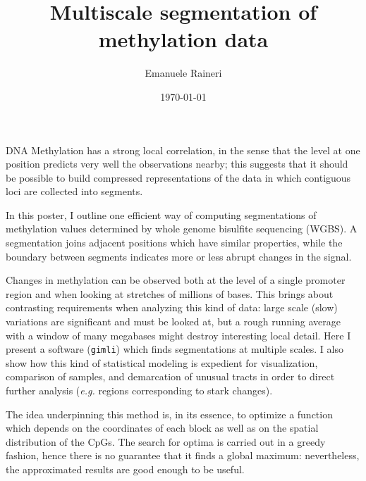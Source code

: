 \documentclass[12pt]{amsart}
\newcommand{\gimli}{\texttt{gimli}}
\newcommand{\eg}{\textit{e.g.}}
\begin{document}
\title{Multiscale segmentation of methylation data}
\author{Emanuele Raineri}
\date{\today}
\maketitle

DNA Methylation has a strong local correlation,
in the sense that the level at one position predicts 
very well the observations nearby; this suggests that it should be possible
to build compressed representations of the data in which contiguous loci 
are collected into segments.

In this poster, I outline one efficient way of computing 
segmentations of methylation values determined by 
whole genome bisulfite sequencing (WGBS).
A segmentation joins adjacent positions
which have similar properties, while the boundary between segments 
indicates more or less abrupt changes
in the signal.

Changes in methylation can be observed both at the level of a single promoter
region  and when looking at stretches
of millions of bases.
This brings about contrasting requirements when analyzing this kind of data: 
large scale (slow) variations are 
significant and must be looked at, but a rough
running average with a window of many megabases might destroy interesting
local detail. Here I present  a software (\gimli{}) which finds  
segmentations at multiple scales.
I also show how this 
kind of statistical modeling is expedient for 
visualization, comparison of samples,
and demarcation of unusual tracts in 
order to direct further analysis 
(\eg{} regions corresponding to stark changes).

The idea underpinning this method is, in its essence, to optimize  
a function which depends on the coordinates
of each block as well as on the spatial distribution of the CpGs.
The search for optima is carried out
in a greedy fashion, hence there is no guarantee
that it finds a global maximum: nevertheless, the approximated results are good enough
to be useful.
\end{document}
